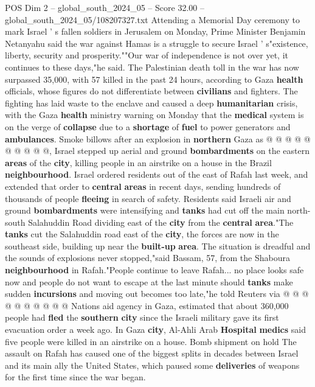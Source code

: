 \begin{textsample}{POS Dim 2 – global\_south\_2024\_05 – Score 32.00 – global\_south\_2024\_05/108207327.txt}
Attending a Memorial Day ceremony to mark Israel ' s fallen soldiers in Jerusalem on Monday, Prime Minister Benjamin Netanyahu said the war against Hamas is a struggle to secure Israel ' s"existence, liberty, security and prosperity.""Our war of independence is not over yet, it continues to these days,"he said.
The Palestinian death toll in the war has now surpassed 35,000, with 57 killed in the past 24 hours, according to Gaza \textbf{health} officials, whose figures do not differentiate between \textbf{civilians} and fighters.
The fighting has laid waste to the enclave and caused a deep \textbf{humanitarian} crisis, with the Gaza \textbf{health} ministry warning on Monday that the \textbf{medical} system is on the verge of \textbf{collapse} due to a \textbf{shortage} of \textbf{fuel} to power generators and \textbf{ambulances}.
Smoke billows after an explosion in \textbf{northern} Gaza as @ @ @ @ @ @ @ @ @ @, Israel stepped up aerial and ground \textbf{bombardments} on the eastern \textbf{areas} of the \textbf{city}, killing people in an airstrike on a house in the Brazil \textbf{neighbourhood}.
Israel ordered residents out of the east of Rafah last week, and extended that order to \textbf{central} \textbf{areas} in recent days, sending hundreds of thousands of people \textbf{fleeing} in search of safety.
Residents said Israeli air and ground \textbf{bombardments} were intensifying and \textbf{tanks} had cut off the main north-south Salahuddin Road dividing east of the \textbf{city} from the \textbf{central} \textbf{area}."The \textbf{tanks} cut the Salahuddin road east of the \textbf{city}, the forces are now in the southeast side, building up near the \textbf{built-up} \textbf{area}.
The situation is dreadful and the sounds of explosions never stopped,"said Bassam, 57, from the Shaboura \textbf{neighbourhood} in Rafah."People continue to leave Rafah... no place looks safe now and people do not want to escape at the last minute should \textbf{tanks} make sudden \textbf{incursions} and moving out becomes too late,"he told Reuters via @ @ @ @ @ @ @ @ @ @ Nations aid agency in Gaza, estimated that about 360,000 people had \textbf{fled} the \textbf{southern} \textbf{city} since the Israeli military gave its first evacuation order a week ago.
In Gaza \textbf{city}, Al-Ahli Arab \textbf{Hospital} \textbf{medics} said five people were killed in an airstrike on a house.
Bomb shipment on hold The assault on Rafah has caused one of the biggest splits in decades between Israel and its main ally the United States, which paused some \textbf{deliveries} of weapons for the first time since the war began.

\end{textsample}
